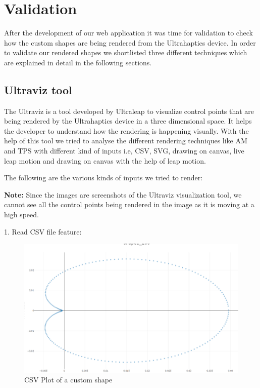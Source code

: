 
\chapter{Validation}
\label{sec:validation}

After the development of our web application it was time for validation to check how the custom shapes are being rendered from the Ultrahaptics device. In order to validate our rendered shapes we shortlisted three different techniques which are explained in detail in the following sections.


\section{Ultraviz tool}
\label{sec:validation:ultraviz}

The Ultraviz is a tool developed by Ultraleap \cite{ul}\cite{ultraviz} to visualize control points that are being rendered by the Ultrahaptics device in a three dimensional space. It helps the developer to understand how the rendering is happening visually. With the help of this tool we tried to analyse the different rendering techniques like AM and TPS with different kind of inputs i.e, CSV, SVG, drawing on canvas, live leap motion and drawing on canvas with the help of leap motion. 

The following are the various kinds of inputs we tried to render:

\textbf{Note:} Since the images are screenshots of the Ultraviz visualization tool, we cannot see all the control points being rendered in the image as it is moving at a high speed.

1. Read CSV file feature:
\begin{figure}[htb]
	\includegraphics[width=\textwidth]{gfx/Read CSV Image.png}
	\caption{CSV Plot of a custom shape}
	\label{fig:validation:csv}
\end{figure}

